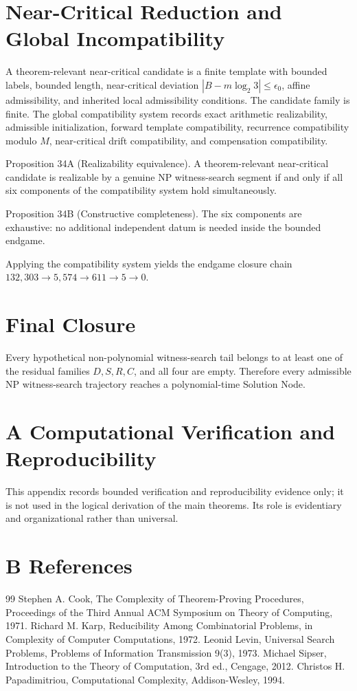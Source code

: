\documentclass[11pt]{article}
\theoremstyle{definition}
\begin{document}
\section{Near-Critical Reduction and Global Incompatibility}
A theorem-relevant near-critical candidate is a finite template with bounded labels, bounded length, near-critical deviation $|B-m\log_2 3|\le \epsilon_0$, affine admissibility, and inherited local admissibility conditions. The candidate family is finite. The global compatibility system records exact arithmetic realizability, admissible initialization, forward template compatibility, recurrence compatibility modulo $M$, near-critical drift compatibility, and compensation compatibility.

Proposition 34A (Realizability equivalence). A theorem-relevant near-critical candidate is realizable by a genuine NP witness-search segment if and only if all six components of the compatibility system hold simultaneously.

Proposition 34B (Constructive completeness). The six components are exhaustive: no additional independent datum is needed inside the bounded endgame.

Applying the compatibility system yields the endgame closure chain $132{,}303 \to 5{,}574 \to 611 \to 5 \to 0$.
\section{Final Closure}
Every hypothetical non-polynomial witness-search tail belongs to at least one of the residual families $D,S,R,C$, and all four are empty. Therefore every admissible NP witness-search trajectory reaches a polynomial-time Solution Node.

\section*{A Computational Verification and Reproducibility}
This appendix records bounded verification and reproducibility evidence only; it is not used in the logical derivation of the main theorems. Its role is evidentiary and organizational rather than universal.

\section*{B References}
\begin{thebibliography}{99}
 Stephen A. Cook, The Complexity of Theorem-Proving Procedures, Proceedings of the Third Annual ACM Symposium on Theory of Computing, 1971.
 Richard M. Karp, Reducibility Among Combinatorial Problems, in Complexity of Computer Computations, 1972.
 Leonid Levin, Universal Search Problems, Problems of Information Transmission 9(3), 1973.
 Michael Sipser, Introduction to the Theory of Computation, 3rd ed., Cengage, 2012.
 Christos H. Papadimitriou, Computational Complexity, Addison-Wesley, 1994.
\end{thebibliography}
\end{document}
